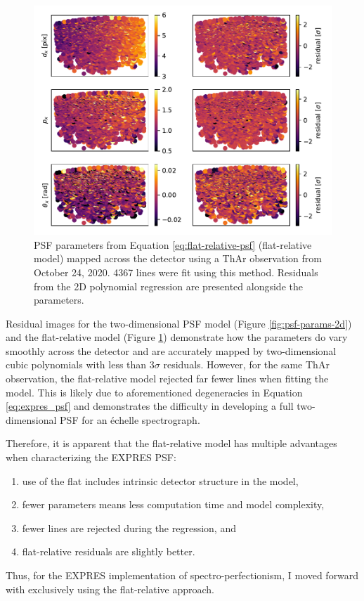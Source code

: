 \begin{figure}
    \centering
    \includegraphics[width=\textwidth]{figures-5/psf-params-1d.pdf}
    \caption[EXPRES flat-relative point spread function model parameters]{PSF parameters from Equation \ref{eq:flat-relative-psf} (flat-relative model) mapped across the detector using a ThAr observation from October 24, 2020. 4367 lines were fit using this method. Residuals from the 2D polynomial regression are presented alongside the parameters.}
    \label{fig:psf-params-1d}
\end{figure}

Residual images for the two-dimensional PSF model (Figure \ref{fig:psf-params-2d}) and the flat-relative model (Figure \ref{fig:psf-params-1d}) demonstrate how the parameters do vary smoothly across the detector and are accurately mapped by two-dimensional cubic polynomials with less than $3\sigma$ residuals. However, for the same ThAr observation, the flat-relative model rejected far fewer lines when fitting the model. This is likely due to aforementioned degeneracies in Equation \ref{eq:expres_psf} and demonstrates the difficulty in developing a full two-dimensional PSF for an \'echelle spectrograph.

Therefore, it is apparent that the flat-relative model has multiple advantages when characterizing the EXPRES PSF:
\begin{enumerate}
    \item use of the flat includes intrinsic detector structure in the model,
    \item fewer parameters means less computation time and model complexity,
    \item fewer lines are rejected during the regression, and
    \item flat-relative residuals are slightly better.
\end{enumerate}
Thus, for the EXPRES implementation of spectro-perfectionism, I moved forward with exclusively using the flat-relative approach.

